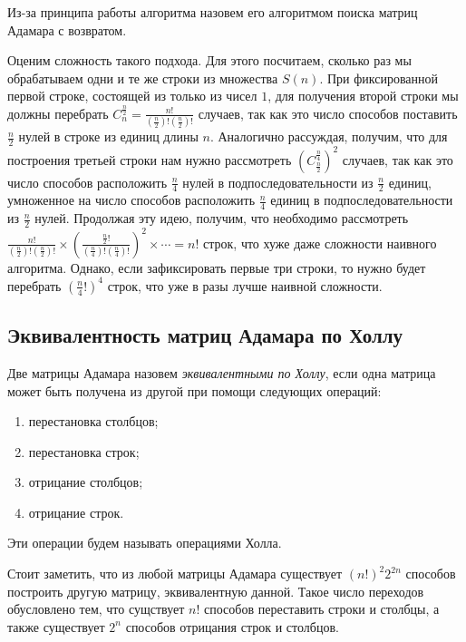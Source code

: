 \documentclass[a4paper, 14pt]{extreport}
\begin{document}
Из-за принципа работы алгоритма назовем его алгоритмом поиска матриц Адамара с возвратом.

Оценим сложность такого подхода. Для этого посчитаем, сколько раз мы обрабатываем одни и те же строки из множества $S(n)$. При фиксированной первой строке, состоящей из только из чисел $1$, для получения второй строки мы должны перебрать $C_n^\frac{n}{2} = \frac{n!}{\left(\frac{n}{2}\right)!\left(\frac{n}{2}\right)!}$ случаев, так как это число способов поставить $\frac{n}{2}$ нулей в строке из единиц длины $n$. Аналогично рассуждая, получим, что для построения третьей строки нам нужно рассмотреть $\left(C_\frac{n}{2}^\frac{n}{4}\right)^2$ случаев, так как это число способов расположить $\frac{n}{4}$ нулей в подпоследовательности из $\frac{n}{2}$ единиц, умноженное на число способов расположить $\frac{n}{4}$ единиц в подпоследовательности из $\frac{n}{2}$ нулей. Продолжая эту идею, получим, что необходимо рассмотреть $\frac{n!}{\left(\frac{n}{2}\right)!\left(\frac{n}{2}\right)!}\times\left(\frac{\frac{n}{2}!}{\left(\frac{n}{4}\right)!\left(\frac{n}{4}\right)!}\right)^2\times\cdots = n!$ строк, что хуже даже сложности наивного алгоритма. Однако, если зафиксировать первые три строки, то нужно будет перебрать $\left(\frac{n}{4}!\right)^4$ строк, что уже в разы лучше наивной сложности.

\subsection{Эквивалентность матриц Адамара по Холлу}

\begin{Df}\normalfont\label{df:had_eq}
    Две матрицы Адамара назовем {\it эквивалентными по Холлу}, если одна матрица может быть получена из другой при помощи следующих операций:
    \begin{enumerate}
        \item перестановка столбцов;
        \item перестановка строк;
        \item отрицание столбцов;
        \item отрицание строк.
    \end{enumerate}
    Эти операции будем называть операциями Холла. 
\end{Df}

Стоит заметить, что из любой матрицы Адамара существует $\left(n!\right)^2 2^{2n}$ способов построить другую матрицу, эквивалентную данной. Такое число переходов обусловлено тем, что сущствует $n!$ способов переставить строки и столбцы, а также существует $2^n$ способов отрицания строк и столбцов.
\end{document}
